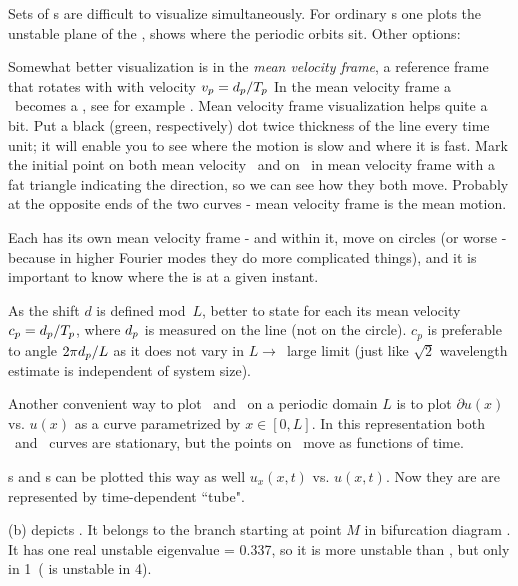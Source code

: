 Sets of \rpo s are difficult to visualize simultaneously.
For ordinary \po s one
plots the unstable plane of the \eqv, shows where the periodic
orbits sit. Other options:

Somewhat better visualization is in the
{\em mean velocity frame}, {\ie}
a reference frame that rotates with with velocity
$v_p=d_p/{T_{p}}$
In the mean velocity frame a \rpo\ becomes
a \po, see  for example .
Mean velocity frame visualization helps quite a bit.
Put a black (green, respectively) dot
twice thickness of the line every time unit; it will enable you to see
where the motion is slow and where it is fast.
Mark the initial point on both
mean velocity \rpo\ and on \eqv\  in mean velocity
 frame with a fat triangle
indicating the direction, so we can see how they both move. Probably at the
opposite ends of the two curves - mean velocity frame is the mean motion.


Each {\rpo} has its own mean velocity frame - and within it, {\eqv}
move on circles (or worse - because in higher Fourier modes they do more
complicated things), and it is important to know where the {\eqv} is at
a given instant.

As the shift $d$ is defined mod~$L$, better to
state for each {\rpo} its mean velocity $c_p = d_p/{T_{p}}$,
where $d_p$ is measured on the line (not on the circle). $c_p$ is
preferable to angle $2\pi d_p/L$ as it does not vary in $L \to$~large
limit (just like $\sqrt{2}$ wavelength estimate is independent of
system size).

Another convenient way to plot \eqva\ and \reqva\ on a periodic
domain $L$ is to plot
$\partial u(x)$ vs. $u(x)$ as a curve parametrized by
$x\in [0,L]$. In this representation both \eqva\ and \reqva\ curves are
stationary, but the points on \reqva\ move as functions of time.

\Po s and \rpo s can be plotted this way as well
$u_x(x,t)$ vs. $u(x,t)$. Now they are are represented by time-dependent
``tube".

(b)
depicts .
It belongs to the branch starting at point $M$
in bifurcation diagram .
It has one real unstable eigenvalue = 0.337,
so it is more unstable than ,
but only in 1\dmn\ ( is unstable in 4\dmn).
